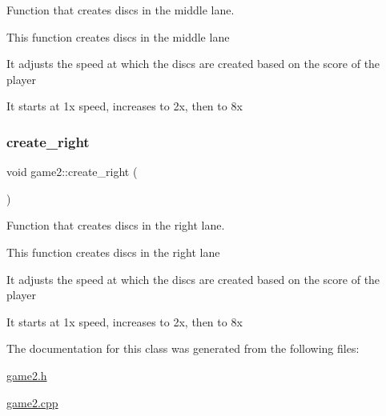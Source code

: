 Function that creates discs in the middle lane. 

This function creates discs in the middle lane

It adjusts the speed at which the discs are created based on the score of the player

It starts at 1x speed, increases to 2x, then to 8x \mbox{\label{classgame2_a1a554d82d02057789cfdfc8381bf5b4c}} 
\subsubsection{\texorpdfstring{create\+\_\+right}{create\_right}}
{\footnotesize\ttfamily void game2\+::create\+\_\+right (\begin{DoxyParamCaption}{ }\end{DoxyParamCaption})\hspace{0.3cm}{\ttfamily [slot]}}



Function that creates discs in the right lane. 

This function creates discs in the right lane

It adjusts the speed at which the discs are created based on the score of the player

It starts at 1x speed, increases to 2x, then to 8x 

The documentation for this class was generated from the following files\+:\begin{DoxyCompactItemize}
\item 
\hyperlink{game2_8h}{game2.\+h}\item 
\hyperlink{game2_8cpp}{game2.\+cpp}\end{DoxyCompactItemize}
